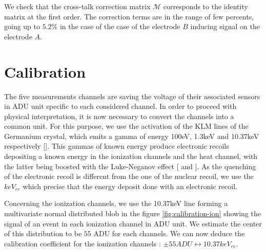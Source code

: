 We check that the cross-talk correction matrix $\mathcal{M}$ corresponds to the identity matrix at the first order. The correction terms are in the range of few percents, going up to $5.2\%$ in the case of the case of the electrode $B$ inducing signal on the electrode $A$.


\section{Calibration}
\label{par:calibration}

The five measurements channels are saving the voltage of their associated sensors in ADU unit specific to each considered channel. In order to proceed with physical interpretation, it is now necessary to convert the channels into a common unit.
For this purpose, we use the activation of the KLM lines of the Germanium crystal, which emits a gamma of energy 100eV, 1.3keV and 10.37keV respectively [\cite{germanium-decay}]. This gammas of known energy produce electronic recoils depositing a known energy in the ionization channels and the heat channel, with the latter being boosted with the Luke-Neganov effect [\cite{luke-neganov-effect} and \citep{luke-neganov-interpretation}]. As the quenching of the electronic recoil is different from the one of the nuclear recoil, we use the $keV_{ee}$ which precise that the energy deposit done with an electronic recoil.

Concerning the ionization channels, we use the 10.37keV line forming a multivariate normal distributed blob in the figure \ref{fig:calibration-ion} showing the signal of an event in each ionization channel in ADU unit. We estimate the center of this distribution to be $55$ ADU for each channels. We can now deduce the calibration coefficient for the ionization channels : $\pm 55 ADU \leftrightarrow 10.37 keV_{ee}$.

